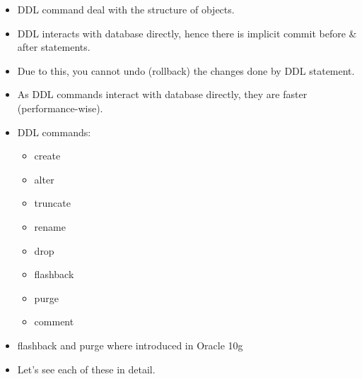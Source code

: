 \setlength{\columnsep}{3pt}
\begin{flushleft}

	\begin{itemize}
		\item DDL command deal with the structure of objects.
		\item DDL interacts with database directly, hence there is implicit commit before \& after statements.
		\item Due to this, you cannot undo (rollback) the changes done by DDL statement.
		\item As DDL commands interact with database directly, they are faster (performance-wise).
		\item DDL commands:
		\begin{itemize}
			\item create
			\item alter
			\item truncate
			\item rename
			\item drop
			\item flashback
			\item purge
			\item comment
		\end{itemize}
		\item flashback and purge where introduced in Oracle 10g
		\item Let's see each of these in detail.
	\end{itemize}

\end{flushleft}

\newpage



